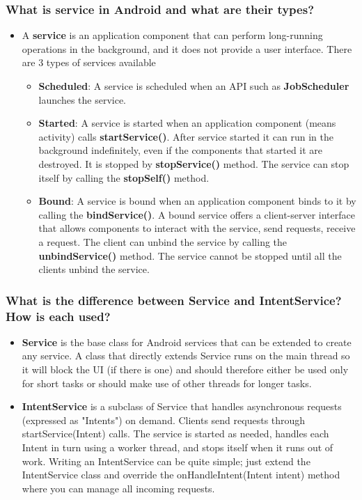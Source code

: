 \documentclass[9pt, b5paper]{article}
\begin{document}
\subsubsection{What is service in Android and what are their types?}
\label{sec-1-4-1}
\begin{itemize}
\item A \textbf{service} is an application component that can perform long-running operations in the background, and it does not provide a user interface. There are 3 types of services available
\begin{itemize}
\item \textbf{Scheduled}: A service is scheduled when an API such as \textbf{JobScheduler} launches the service.
\item \textbf{Started}: A service is started when an application component (means activity) calls \textbf{startService()}. After service started it can run in the background indefinitely, even if the components that started it are destroyed. It is stopped by \textbf{stopService()} method. The service can stop itself by calling the \textbf{stopSelf()} method.
\item \textbf{Bound}: A service is bound when an application component binds to it by calling the \textbf{bindService()}. A bound service offers a client-server interface that allows components to interact with the service, send requests, receive a request. The client can unbind the service by calling the \textbf{unbindService()} method. The service cannot be stopped until all the clients unbind the service.
\end{itemize}
\end{itemize}

\subsubsection{What is the difference between Service and IntentService? How is each used?}
\label{sec-1-4-2}
\begin{itemize}
\item \textbf{Service} is the base class for Android services that can be extended to create any service. A class that directly extends Service runs on the main thread so it will block the UI (if there is one) and should therefore either be used only for short tasks or should make use of other threads for longer tasks.
\item \textbf{IntentService} is a subclass of Service that handles asynchronous requests (expressed as "Intents") on demand. Clients send requests through startService(Intent) calls. The service is started as needed, handles each Intent in turn using a worker thread, and stops itself when it runs out of work. Writing an IntentService can be quite simple; just extend the IntentService class and override the onHandleIntent(Intent intent) method where you can manage all incoming requests.
\end{itemize}
\end{document}
